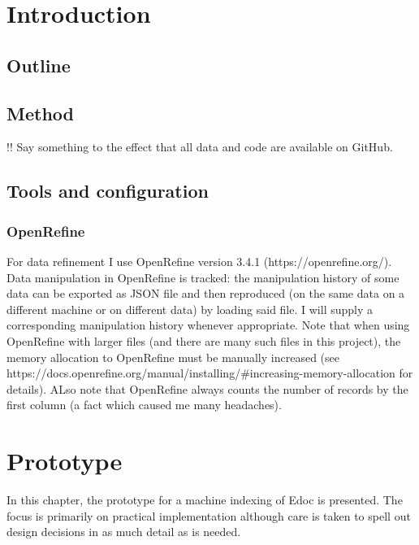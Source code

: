 \hypertarget{introduction}{%
\section{Introduction}\label{introduction}}

\hypertarget{outline}{%
\subsection{Outline}\label{outline}}

\hypertarget{method}{%
\subsection{Method}\label{method}}

!! Say something to the effect that all data and code are available on
GitHub.

\hypertarget{tools-and-configuration}{%
\subsection{Tools and configuration}\label{tools-and-configuration}}

\hypertarget{openrefine}{%
\subsubsection{OpenRefine}\label{openrefine}}

For data refinement I use OpenRefine version 3.4.1
(https://openrefine.org/). Data manipulation in OpenRefine is tracked:
the manipulation history of some data can be exported as JSON file and
then reproduced (on the same data on a different machine or on different
data) by loading said file. I will supply a corresponding manipulation
history whenever appropriate. Note that when using OpenRefine with
larger files (and there are many such files in this project), the memory
allocation to OpenRefine must be manually increased (see
https://docs.openrefine.org/manual/installing/\#increasing-memory-allocation
for details). ALso note that OpenRefine always counts the number of
records by the first column (a fact which caused me many headaches).

\hypertarget{prototype}{%
\section{Prototype}\label{prototype}}

In this chapter, the prototype for a machine indexing of Edoc is
presented. The focus is primarily on practical implementation although
care is taken to spell out design decisions in as much detail as is
needed.

